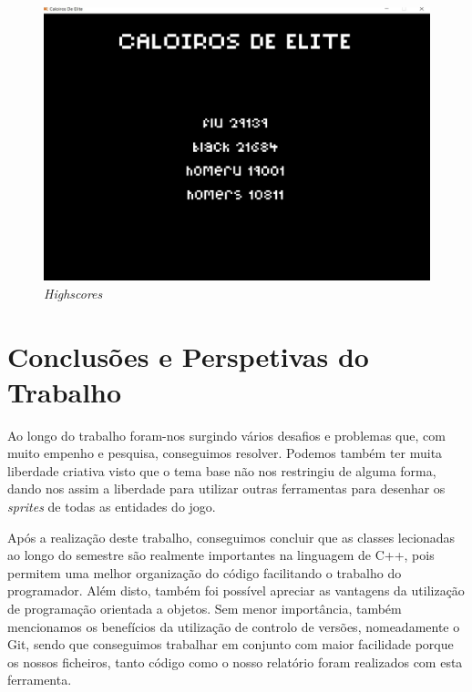 \documentclass[a4paper,11pt]{article}
\newcommand\tab[1][0.8cm]{\hspace*{#1}}
\begin{document}
\vspace*{8pt}

\begin{figure}[H]
    \centering
    \includegraphics[scale = 0.3]{1 - Imagens/highscore.png}
    \caption{\textit{Highscores}}
    \label{fig:Highscores}
\end{figure}



\pagebreak


\section{Conclusões e Perspetivas do Trabalho}

\tab Ao longo do trabalho foram-nos surgindo vários desafios e problemas que, com muito empenho e pesquisa, conseguimos resolver. Podemos também ter muita liberdade criativa visto que o tema base não nos restringiu de alguma forma, dando nos assim a liberdade para utilizar outras ferramentas para desenhar os \textit{sprites} de todas as entidades do jogo.

\vspace{8pt}

Após a realização deste trabalho, conseguimos concluir que as classes lecionadas ao longo do semestre são realmente importantes na linguagem de C++, pois permitem uma melhor organização do código facilitando o trabalho do programador. Além disto, também foi possível apreciar as vantagens da utilização de programação orientada a objetos. Sem menor importância, também mencionamos os benefícios da utilização de controlo de versões, nomeadamente o Git, sendo que conseguimos trabalhar em conjunto com maior facilidade porque os nossos ficheiros, tanto código \cite{code} como o nosso relatório \cite{docs} foram realizados com esta ferramenta.
\end{document}
